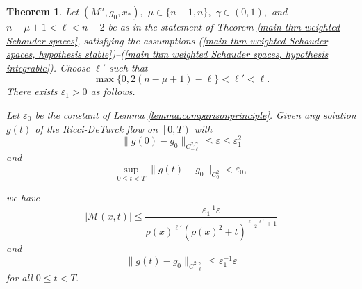 \documentclass[12pt]{amsart}
\newcommand{\calM}{\mathcal{M}}
\newcommand{\LB}{\left[}
\renewcommand{\1}{{\mathbf 1}}
\newcommand{\eps}{{\varepsilon}}
\newtheorem{thm}{Theorem}[section]
\theoremstyle{others}
\numberwithin{equation}{section}
\begin{document}
\begin{thm}\label{thm:Mestimate}
    Let $(M^n, g_0 , x_*),$ $\mu \in \{n-1, n\},$ $\gamma \in \left( 0,1 \right),$ and $n - \mu + 1 < \ell < n-2$ be as in the statement of Theorem \ref{main thm weighted Schauder spaces}, satisfying the assumptions (\ref{main thm weighted Schauder spaces, hypothesis stable})--(\ref{main thm weighted Schauder spaces, hypothesis integrable}). %
    Choose $\ell'$ such that 
    $$\max\{ 0, 2(n - \mu + 1) -\ell \} <  \ell' < \ell .$$
    There exists $\eps_1 > 0$ as follows.
    
    Let $\eps_0$ be the constant of Lemma \ref{lemma:comparisonprinciple}. Given any solution $g(t)$ of the Ricci-DeTurck flow on $\LB 0, T \right)$ with
    \begin{equation}
        \| g(0) - g_0 \|_{C^{2, \gamma}_{-\ell}} \leq \eps \leq \eps_1^2
    \end{equation}
    and
    \begin{equation}\label{Mestimate:C20bound}
        \sup_{0 \leq t < T} \| g(t) - g_0 \|_{C^{2}_0} < \eps_0,
    \end{equation}

    we have
        \begin{equation}\label{Mestimate:Mestimate}
        |\calM(x,t)| \leq \frac{\eps_1^{-1} \eps}{ \rho(x)^{\ell'} (\rho(x)^2 + t)^{\frac{\ell - \ell'}{2} + 1}}
    \end{equation}
    and
     \begin{equation}\label{Mestimate:gestimate}
        \| g(t) - g_0 \|_{C^{2, \gamma}_{-\ell}} \leq \eps_1^{-1} \eps
    \end{equation}
    for all $0 \leq t < T.$
\end{thm}
\end{document}
